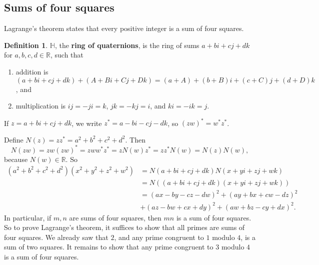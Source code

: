 \documentclass{article}
\newcommand{\R}{\mathbb{R}}
\renewcommand{\H}{\mathbb{H}}
\newcommand{\rb}[1]{\left( #1 \right)}
\theoremstyle{definition}\newtheorem{definition}{Definition}
\theoremstyle{definition}\newtheorem*{remark}{Remark}
\theoremstyle{definition}\newtheorem*{example}{Example}
\theoremstyle{definition}\newtheorem*{note}{Note}
\begin{document}
\subsection{Sums of four squares}

Lagrange's theorem states that every positive integer is a sum of four squares.

\begin{definition}
$ \H $, the \textbf{ring of quaternions}, is the ring of sums $ a + bi + cj + dk $ for $ a, b, c, d \in \R $, such that
\begin{enumerate}
\item addition is $ \rb{a + bi + cj + dk} + \rb{A + Bi + Cj + Dk} = \rb{a + A} + \rb{b + B}i + \rb{c + C}j + \rb{d + D}k $, and
\item multiplication is $ ij = -ji = k $, $ jk = -kj = i $, and $ ki = -ik = j $.
\end{enumerate}
If $ z = a + bi + cj + dk $, we write $ z^* = a - bi - cj - dk $, so $ \rb{zw}^* = w^*z^* $.
\end{definition}

Define $ N\rb{z} = zz^* = a^2 + b^2 + c^2 + d^2 $. Then
$$ N\rb{zw} = zw\rb{zw}^* = zww^*z^* =  zN\rb{w}z^* = zz^*N\rb{w} = N\rb{z}N\rb{w}, $$
because $ N\rb{w} \in \R $. So
\begin{align*}
\rb{a^2 + b^2 + c^2 + d^2}\rb{x^2 + y^2 + z^2 + w^2}
& = N\rb{a + bi + cj + dk}N\rb{x + yi + zj + wk} \\
& = N\rb{\rb{a + bi + cj + dk}\rb{x + yi + zj + wk}} \\
& = \rb{ax - by - cz - dw}^2 + \rb{ay + bx + cw - dz}^2 \\
& + \rb{az - bw + cx + dy}^2 + \rb{aw + bz - cy + dx}^2.
\end{align*}
In particular, if $ m, n $ are sums of four squares, then $ mn $ is a sum of four squares. So to prove Lagrange's theorem, it suffices to show that all primes are sums of four squares. We already saw that $ 2 $, and any prime congruent to $ 1 $ modulo $ 4 $, is a sum of two squares. It remains to show that any prime congruent to $ 3 $ modulo $ 4 $ is a sum of four squares.
\end{document}
